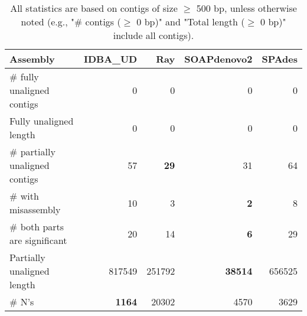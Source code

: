 \documentclass[12pt,a4paper]{article}
\begin{document}
\begin{table}[ht]
\begin{center}
\caption{All statistics are based on contigs of size $\geq$ 500 bp, unless otherwise noted (e.g., "\# contigs ($\geq$ 0 bp)" and "Total length ($\geq$ 0 bp)" include all contigs).}
\begin{tabular}{|l*{4}{|r}|}
\hline
Assembly & IDBA\_UD & Ray & SOAPdenovo2 & SPAdes \\ \hline
\# fully unaligned contigs & 0 & 0 & 0 & 0 \\ \hline
Fully unaligned length & 0 & 0 & 0 & 0 \\ \hline
\# partially unaligned contigs & 57 & {\bf 29} & 31 & 64 \\ \hline
\hspace{5mm}\# with misassembly & 10 & 3 & {\bf 2} & 8 \\ \hline
\hspace{5mm}\# both parts are significant & 20 & 14 & {\bf 6} & 29 \\ \hline
Partially unaligned length & 817549 & 251792 & {\bf 38514} & 656525 \\ \hline
\# N's & {\bf 1164} & 20302 & 4570 & 3629 \\ \hline
\end{tabular}
\end{center}
\end{table}
\end{document}

